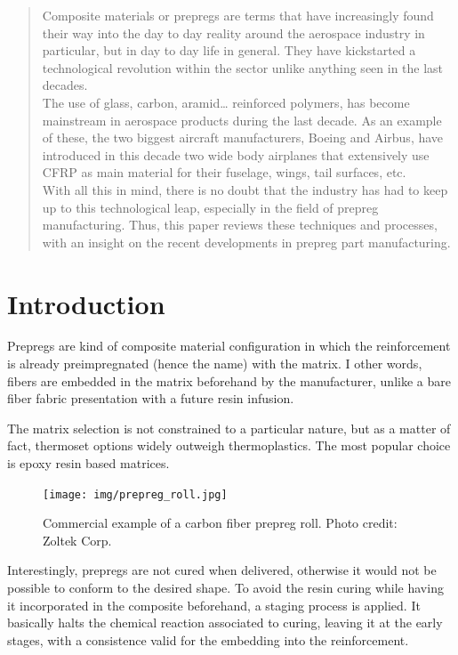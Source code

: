 \begin{abstract}

Composite materials or prepregs are terms that have increasingly found their
way into the day to day reality around the aerospace industry in particular, but
in day to day life in general. They have kickstarted a technological revolution
within the sector unlike anything seen in the last decades.\\

The use of glass, carbon, aramid… reinforced polymers, has become mainstream
in aerospace products during the last decade. As an example of these, the two
biggest aircraft manufacturers, Boeing and Airbus, have introduced in this decade
two wide body airplanes that extensively use CFRP as main material for their fuselage,
wings, tail surfaces, etc.\\

With all this in mind, there is no doubt that the industry has had to keep up
to this technological leap, especially in the field of prepreg manufacturing.
Thus, this paper reviews these techniques and processes, with an insight on the
recent developments in prepreg part manufacturing.\\

\end{abstract}

\section{Introduction}

Prepregs are kind of composite material configuration in which the reinforcement
is already preimpregnated (hence the name) with the matrix. I other words, fibers
are embedded in the matrix beforehand by the manufacturer, unlike a bare fiber
fabric presentation with a future resin infusion.

The matrix selection is not constrained to a particular nature, but as a matter
of fact, thermoset options widely outweigh thermoplastics. The most popular choice
is epoxy resin based matrices.

\begin{figure}[h]
	\centering
	\texttt{[image: img/prepreg\_roll.jpg]}
	\caption[Carbon fiber prepreg roll]{Commercial example of a carbon fiber prepreg roll.
	Photo credit: Zoltek Corp.}
	\label{fig:prepreg_roll}
\end{figure}

Interestingly, prepregs are not cured when delivered, otherwise it would not be
possible to conform to the desired shape. To avoid the resin curing while having
it incorporated in the composite beforehand, a staging process is applied. It
basically halts the chemical reaction associated to curing, leaving it at the early
stages, with a consistence valid for the embedding into the reinforcement.\\

